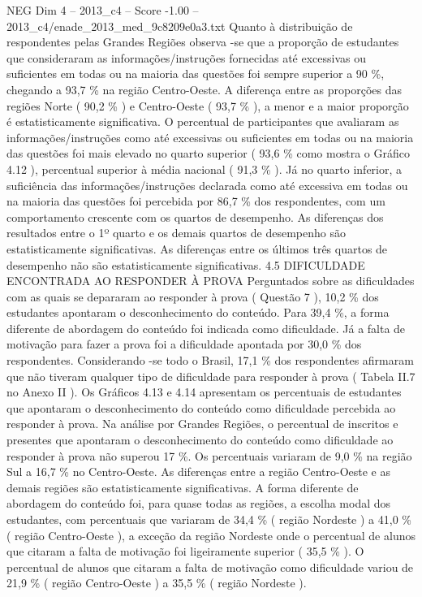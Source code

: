 \begin{textsample}{NEG Dim 4 – 2013\_c4 – Score -1.00 – 2013\_c4/enade\_2013\_med\_9c8209e0a3.txt}
Quanto à distribuição de respondentes pelas Grandes Regiões observa -se que a proporção de estudantes que consideraram as informações/instruções fornecidas até excessivas ou suficientes em todas ou na maioria das questões foi sempre superior a 90 \%, chegando a 93,7 \% na região Centro-Oeste.
A diferença entre as proporções das regiões Norte ( 90,2 \% ) e Centro-Oeste ( 93,7 \% ), a menor e a maior proporção é estatisticamente significativa.
O percentual de participantes que avaliaram as informações/instruções como até excessivas ou suficientes em todas ou na maioria das questões foi mais elevado no quarto superior ( 93,6 \% como mostra o Gráfico 4.12 ), percentual superior à média nacional ( 91,3 \% ).
Já no quarto inferior, a suficiência das informações/instruções declarada como até excessiva em todas ou na maioria das questões foi percebida por 86,7 \% dos respondentes, com um comportamento crescente com os quartos de desempenho.
As diferenças dos resultados entre o 1º quarto e os demais quartos de desempenho são estatisticamente significativas.
As diferenças entre os últimos três quartos de desempenho não são estatisticamente significativas. 4.5 DIFICULDADE ENCONTRADA AO RESPONDER À PROVA Perguntados sobre as dificuldades com as quais se depararam ao responder à prova ( Questão 7 ), 10,2 \% dos estudantes apontaram o desconhecimento do conteúdo.
Para 39,4 \%, a forma diferente de abordagem do conteúdo foi indicada como dificuldade.
Já a falta de motivação para fazer a prova foi a dificuldade apontada por 30,0 \% dos respondentes.
Considerando -se todo o Brasil, 17,1 \% dos respondentes afirmaram que não tiveram qualquer tipo de dificuldade para responder à prova ( Tabela II.7 no Anexo II ).
Os Gráficos 4.13 e 4.14 apresentam os percentuais de estudantes que apontaram o desconhecimento do conteúdo como dificuldade percebida ao responder à prova.
Na análise por Grandes Regiões, o percentual de inscritos e presentes que apontaram o desconhecimento do conteúdo como dificuldade ao responder à prova não superou 17 \%.
Os percentuais variaram de 9,0 \% na região Sul a 16,7 \% no Centro-Oeste.
As diferenças entre a região Centro-Oeste e as demais regiões são estatisticamente significativas.
A forma diferente de abordagem do conteúdo foi, para quase todas as regiões, a escolha modal dos estudantes, com percentuais que variaram de 34,4 \% ( região Nordeste ) a 41,0 \% ( região Centro-Oeste ), a exceção da região Nordeste onde o percentual de alunos que citaram a falta de motivação foi ligeiramente superior ( 35,5 \% ).
O percentual de alunos que citaram a falta de motivação como dificuldade variou de 21,9 \% ( região Centro-Oeste ) a 35,5 \% ( região Nordeste ).

\end{textsample}
